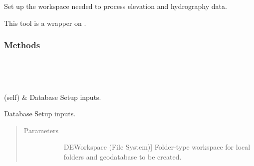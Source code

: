 \documentclass[letterpaper,10pt,english]{sphinxmanual}
\begin{document}
\begin{fulllineitems}
\label{\detokenize{StreamStats_DataPrep:StreamStats_DataPrep.databaseSetup}}
Set up the workspace needed to process elevation and hydrography data.

This tool is a wrapper on {\hyperref[\detokenize{databaseSetup:databaseSetup.databaseSetup}]{}}.
\subsubsection*{Methods}


\begin{savenotes}\sphinxatlongtablestart\begin{longtable}{}
\hline

\endfirsthead

%
{}\\
\hline

\endhead

\hline
{}\\
\endfoot

\endlastfoot

{\hyperref[\detokenize{StreamStats_DataPrep:StreamStats_DataPrep.databaseSetup.getParameterInfo}]{}}(self)
&
Database Setup inputs.
\\
\hline
\end{longtable}\sphinxatlongtableend\end{savenotes}

\begin{fulllineitems}
\label{\detokenize{StreamStats_DataPrep:StreamStats_DataPrep.databaseSetup.getParameterInfo}}
Database Setup inputs.
\begin{quote}\begin{description}
\item[{Parameters}] \leavevmode\begin{description}
\item[{}] \leavevmode{[}DEWorkspace (File System){]}
Folder-type workspace for local folders and geodatabase to be created.


\end{description}
\end{description}
\end{quote}
\end{fulllineitems}
\end{fulllineitems}
\end{document}
